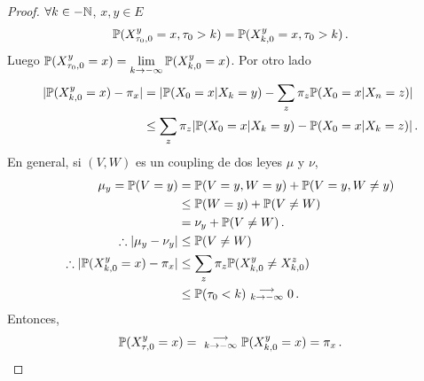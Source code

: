 \begin{proof}  %
\gris
$\forall k\in -\N$, $x,y\in E$
$$ \P(X^y_{\tau_0,0}=x,\tau_0>k) = \P(X^y_{k,0}=x,\tau_0>k) \,.$$
Luego $\P(X^y_{\tau_0,0}=x)=\displaystyle\lim_{k\to-\infty}\P(X^y_{k,0}=x)$. Por otro lado
\begin{alignat*}{2}
    |\P(X^y_{k,0}=x)-\pi_x| & = |\P(X_0=x|X_k=y)-\displaystyle\sum_z\pi_z\P(X_0=x|X_n=z)| \\
     & \leq \sum_{z}\pi_z|\P(X_0=x|X_k=y)-\P(X_0=x|X_k=z)|\,.
\end{alignat*}
En general, si $(V,W)$ es un coupling de dos leyes $\mu$ y $\nu$,
\begin{alignat*}{2}
\mu_y = \P(V=y) & = \P(V=y,W=y)+\P(V=y,W\neq y) \\
 & \leq \P(W=y)+\P(V\neq W) \\
 & = \nu_y + \P(V\neq W)\,. \\
 \therefore |\mu_y-\nu_y| & \leq \P(V\neq W) \\
 \therefore |\P(X^y_{k,0}=x)-\pi_x| & \leq \displaystyle\sum_z\pi_z\P(X^y_{k,0} \neq X^z_{k,0}) \\
 & \leq \P(\tau_0<k) \mbox{ }\substack{\longrightarrow \\ k\to-\infty}\mbox{ }0\, .
\end{alignat*}
Entonces,
$$ \P(X^y_{\tau,0}=x)=\mbox{ }\substack{\longrightarrow \\ k\to-\infty}\mbox{ }\P(X^y_{k,0}=x)=\pi_x \, .$$
\findem
\negro
\end{proof}
\vspace{.5cm}\\
